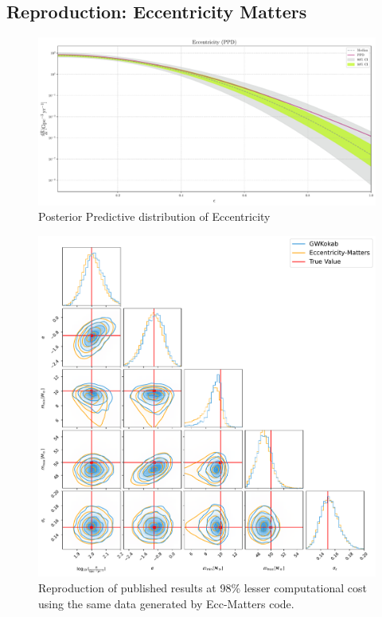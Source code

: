 \documentclass[a0,portrait]{a0poster}
\begin{document}
\begin{multicols}{3}

\section*{Reproduction: Eccentricity Matters}

\begin{frame}

\begin{figure}[H]
    \centering
    \includegraphics[width=0.7\linewidth]{assets/plots/rate_ecc_ppd_plot.pdf}
    \caption{Posterior Predictive distribution of Eccentricity}
    \label{fig:ppd-ecc}
\end{figure}

\begin{figure}[H]
    \centering
    \includegraphics[width=0.7\linewidth]{assets/plots/normalized_ecc_data.pdf}
    \caption{Reproduction of published results at 98\% lesser computational cost using the same data generated by Ecc-Matters code.}
    \label{fig:ecc_matters_reproduction}
\end{figure}

\end{frame}


\end{multicols}
\end{document}
